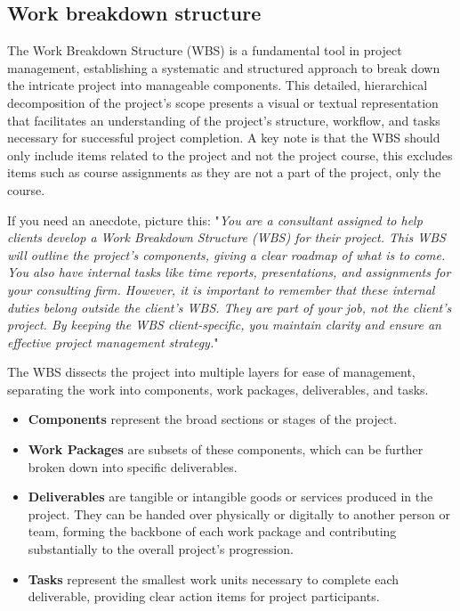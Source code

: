 \documentclass[10pt]{projectdoc}
\begin{document}
\subsection{Work breakdown structure}
The Work Breakdown Structure (WBS) is a fundamental tool in project management, establishing a systematic and structured approach to break down the intricate project into manageable components. This detailed, hierarchical decomposition of the project's scope presents a visual or textual representation that facilitates an understanding of the project's structure, workflow, and tasks necessary for successful project completion. A key note is that the WBS should only include items related to the project and not the project course, this excludes items such as course assignments as they are not a part of the project, only the course.

If you need an anecdote, picture this: "\textit{You are a consultant assigned to help clients develop a Work Breakdown Structure (WBS) for their project. This WBS will outline the project's components, giving a clear roadmap of what is to come. You also have internal tasks like time reports, presentations, and assignments for your consulting firm. However, it is important to remember that these internal duties belong outside the client's WBS. They are part of your job, not the client's project. By keeping the WBS client-specific, you maintain clarity and ensure an effective project management strategy.}"

The WBS dissects the project into multiple layers for ease of management, separating the work into components, work packages, deliverables, and tasks.

\begin{itemize}
\item \textbf{Components} represent the broad sections or stages of the project.
\item \textbf{Work Packages} are subsets of these components, which can be further broken down into specific deliverables.
\item \textbf{Deliverables} are tangible or intangible goods or services produced in the project. They can be handed over physically or digitally to another person or team, forming the backbone of each work package and contributing substantially to the overall project's progression.
\item \textbf{Tasks} represent the smallest work units necessary to complete each deliverable, providing clear action items for project participants.
\end{itemize}
\end{document}
